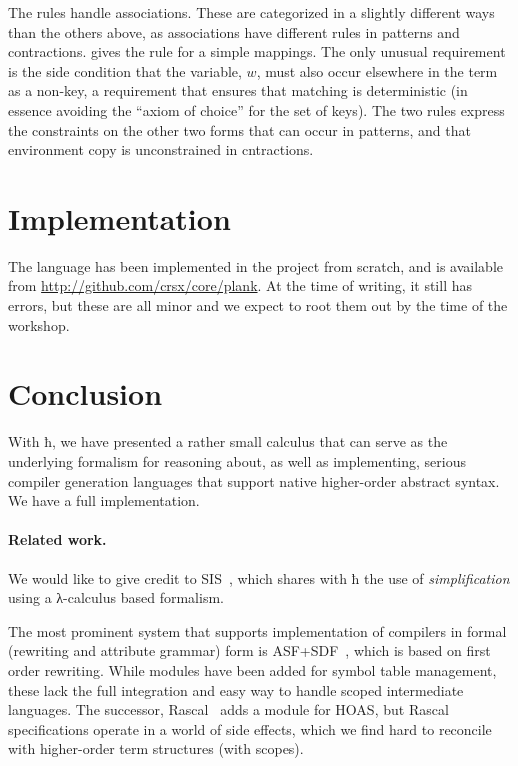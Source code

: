 \documentclass[letterpaper,10pt]{proc}
\begin{document}
The  rules handle associations. These are categorized in a slightly different ways
than the others above, as associations have different rules in patterns and contractions.
 gives the rule for a simple mappings. The only unusual requirement is the side
condition that the variable, $w$, must also occur elsewhere in the term as a non-key, a requirement
that ensures that matching is deterministic (in essence avoiding the ``axiom of choice'' for the set
of keys).
The two  rules express the constraints on the other two forms that can occur in
patterns, and  that environment copy is unconstrained in cntractions.


\section{Implementation}
\label{sec:imp}

The \plank language has been implemented in the \CRSX project from scratch, and is available from
\url{http://github.com/crsx/core/plank}. At the time of writing, it still has errors, but these are
all minor and we expect to root them out by the time of the workshop.


\section{Conclusion}
\label{sec:conc}

With ħ, we have presented a rather small calculus that can serve as the underlying formalism for
reasoning about, as well as implementing, serious compiler generation languages that support native
higher-order abstract syntax. We have a full implementation.

\paragraph*{Related work.}

We would like to give credit to SIS~\cite{Mosses:daimi1979}, which shares with ħ the use of
\emph{simplification} using a λ-calculus based formalism.

The most prominent system that supports implementation of compilers in formal (rewriting and
attribute grammar) form is ASF+SDF~\cite{Brand+:toplas2002}, which is based on first order
rewriting. While modules have been added for symbol table management, these lack the full
integration and easy way to handle scoped intermediate languages. The successor,
Rascal~\cite{Bos+:eptcs2011} adds a module for HOAS, but Rascal specifications operate in a world of
side effects, which we find hard to reconcile with higher-order term structures (with scopes).
\end{document}
